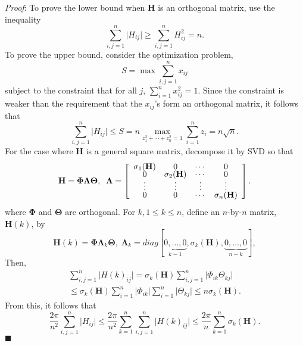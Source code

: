\documentclass[12pt,onecolumn,draftcls]{IEEEtran}
\begin{document}
\noindent
\textit{Proof}: \rm
To prove the lower bound when $\mathbf{H}$ is an orthogonal matrix, use the inequality
\begin{equation}
\sum_{i,j=1}^n \vert H_{ij} \vert \geq \sum_{i,j=1}^n H_{ij}^2 =n.
\end{equation}
To prove the upper bound, consider the optimization problem,
\begin{equation}
S=\max \sum_{i,j=1}^n x_{ij}
\end{equation}
subject to the constraint that for all $j$,
$\sum_{i=1}^n x_{ij}^2 =1$.
Since the constraint is weaker than the requirement that the $x_{ij}$'s form an orthogonal matrix,
it follows that
\begin{equation}
\sum_{i,j=1}^n \vert H_{ij} \vert \leq S = n \max_{z_1^2+\cdots +z_n^2=1} \sum_{i=1}^n z_i = n\sqrt{n}.
\end{equation}
For the case where $\mathbf{H}$ is a general square matrix, decompose it by SVD so that
\begin{equation}
\mathbf{H}=\mathbf{\Phi}\mathbf{\Lambda}\mathbf{\Theta}, \;\;
\mathbf{\Lambda}=\left[
\begin{array}{cccc}
\sigma_1(\mathbf{H}) & 0 & \cdots & 0 \vspace{-.1cm}\\
0 & \sigma_2(\mathbf{H}) & \cdots & 0 \vspace{-.1cm}\\
\vdots & \vdots & \vdots & \vdots \vspace{-.1cm}\\
0 & 0 & \cdots &  \sigma_n(\mathbf{H})
\end{array} \right].
\end{equation}
where $\mathbf{\Phi}$ and $\mathbf{\Theta}$ are orthogonal.
For $k, 1 \leq k \leq n$, define an $n$-by-$n$ matrix,  $\mathbf{H}(k)$, by
\begin{equation}
\mathbf{H}(k) = \mathbf{\Phi}\mathbf{\Lambda}_k\mathbf{\Theta},\;
\mathbf{\Lambda}_k = diag [ \underbrace{0, \ldots, 0}_{k-1}, \sigma_k(\mathbf{H}),
\underbrace{0, \ldots, 0}_{n-k} ],
\end{equation}
Then,
\begin{equation}
\begin{array}{lll}
\sum_{i,j=1}^n \vert H(k)_{ij} \vert =  \sigma_k(\mathbf{H})
\sum_{i,j=1}^n \vert \Phi_{ik}\Theta_{kj} \vert \\
 \leq  \sigma_k(\mathbf{H}) \sum_{i=1}^n \vert \Phi_{ik} \vert \sum_{i=1}^n \vert \Theta_{kj} \vert
 \leq  n \sigma_k(\mathbf{H}).
\end{array}
\end{equation}
From this, it follows that
\begin{equation}
\frac{2\pi}{n^2} \sum_{i,j=1}^n \vert H_{ij} \vert \leq
\frac{2\pi}{n^2}  \sum_{k=1}^n \sum_{i,j=1}^n \vert H(k)_{ij} \vert
\leq \frac{2\pi}{n} \sum_{k=1}^n \sigma_k(\mathbf{H}).
\end{equation}
\hfill $\blacksquare$
\end{document}
